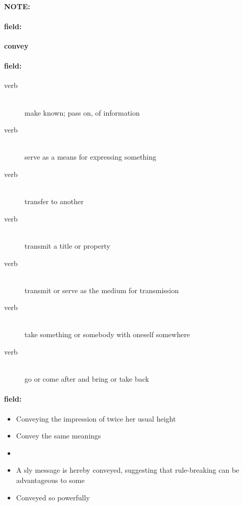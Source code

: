 \documentclass[12pt]{article}
\newenvironment{note}{\paragraph{NOTE:}}{}
\newenvironment{field}{\paragraph{field:}}{}
\begin{document}
\begin{note}
\begin{field}
\textbf{\large convey}
\end{field}


\begin{field}
\begin{description}
\item[verb] \hfill \\ 
make known; pass on, of information

\item[verb] \hfill \\ 
serve as a means for expressing something

\item[verb] \hfill \\ 
transfer to another

\item[verb] \hfill \\ 
transmit a title or property

\item[verb] \hfill \\ 
transmit or serve as the medium for transmission

\item[verb] \hfill \\ 
take something or somebody with oneself somewhere

\item[verb] \hfill \\ 
go or come after and bring or take back

\end{description}
\end{field}

\begin{field}
\begin{itemize}
\item Conveying the impression of twice her usual height
\item Convey the same meanings
\item 
\item A sly message is hereby conveyed, suggesting that rule-breaking can be advantageous to some
\item Conveyed so powerfully
\end{itemize}
\end{field}
\end{note}
\end{document}
